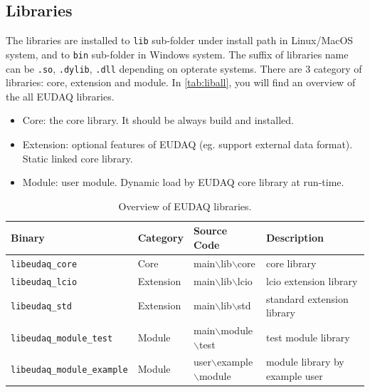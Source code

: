 \subsection{Libraries}
The libraries are installed to \texttt{lib} sub-folder under install path in Linux/MacOS system, and to \texttt{bin} sub-folder in Windows system. The suffix of libraries name can be \texttt{.so}, \texttt{.dylib}, \texttt{.dll} depending on opterate systems. There are 3 category of libraries: core, extension and module. In \autoref{tab:liball}, you will find an overview of the all EUDAQ libraries.\\

\begin{itemize}
\item Core: the core library. It should be always build and installed.
\item Extension: optional features of EUDAQ (eg. support external data format). Static linked core library.
\item Module: user module. Dynamic load by EUDAQ core library at run-time.
\end{itemize}

\begin{table}
\centering
\small
\begin{tabular}{ l | l | l | p{4cm}}
  \textbf{Binary} & \textbf{Category} & \textbf{Source Code} & \textbf{Description}\\
  \hline
  \hline
  \texttt{libeudaq\_core} & Core & main$\backslash$lib$\backslash$core & core library \\
  \hline
  \texttt{libeudaq\_lcio} & Extension & main$\backslash$lib$\backslash$lcio & lcio extension library \\
  \texttt{libeudaq\_std} & Extension & main$\backslash$lib$\backslash$std & standard extension library \\
  \hline
  \texttt{libeudaq\_module\_test} & Module & main$\backslash$module$\backslash$test & test module library \\
  \texttt{libeudaq\_module\_example} & Module & user$\backslash$example$\backslash$module &  module library by example user\\
\end{tabular}
\caption{Overview of EUDAQ libraries.}
\label{tab:liball}
\end{table}
